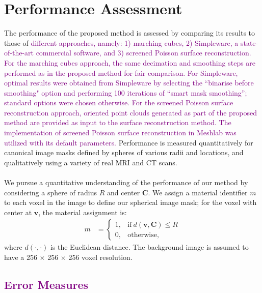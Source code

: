 \section{Performance Assessment}
%

The performance of the proposed method is assessed by comparing its results to those of \textcolor{purple}{different approaches, namely: 1) marching cubes, 2) Simpleware, a state-of-the-art commercial software, and 3) screened Poisson surface reconstruction. For the marching cubes approach, the same decimation and smoothing steps are performed as in the proposed method for fair comparison. For Simpleware, optimal results were obtained from \textcolor{purple}{Simpleware} by selecting the ``binarise before smoothing" option and performing 100 iterations of ``smart mask smoothing''; standard options were chosen otherwise. For the screened Poisson surface reconstruction approach, oriented point clouds generated as part of the proposed method are provided as input to the surface reconstruction method. The implementation of screened Poisson surface reconstruction in Meshlab was utilized with its default parameters.} Performance is measured quantitatively for canonical image masks defined by spheres of various radii and locations, and qualitatively using a variety of real MRI and CT scans. \\ \\
%
We pursue a quantitative understanding of the performance of our method by considering a sphere of radius $R$ and center $\bm{C}$.  We assign a material identifier $m$ to each voxel in the image to define our spherical image mask; for the voxel with center at $\bm{v}$, the material assignment is:
\begin{align} 
	m &=  \begin{cases}
		1, & \text{if}\ d \left(\bm{v},\bm{C}\right) \le R \\
		0, & \text{otherwise},
	\end{cases}
\end{align}
where $d(\cdot,\cdot)$ is the Euclidean distance. The background image is assumed to have a 256 $\times$ 256 $\times$ 256 voxel resolution.
\subsection{\textcolor{purple}{Error Measures}}
\label{Error Measures}

